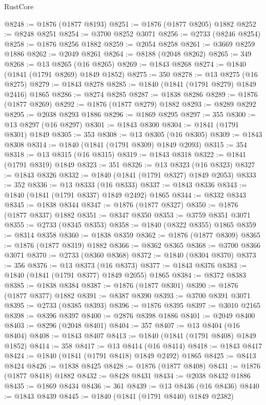 \begin{lexlean}{RustCore}
\begin{coremodule}
@8248 := @1876 (@1877 @8193)
@8251 := @1876 (@1877 @8205) @1882
@8252 := @8248 @8251
@8254 := @3700 @8252 @3071
@8256 := @2733 (@8246 @8254)
@8258 := @1876 @8256 @1882
@8259 := @2054 @8258
@8261 := @3669 @8259 @1886
@8262 := @2049 @8261
@8264 := @8188 (@2048 @8262)
@8265 := 349
@8268 := @13 @8265 (@16 @8265)
@8269 := @1843 @8268
@8274 := @1840 (@1841 (@1791 @8269) @1849 @1852)
@8275 := 350
@8278 := @13 @8275 (@16 @8275)
@8279 := @1843 @8278
@8285 := @1840 (@1841 (@1791 @8279) @1849 @2416) @1865
@8286 := @8274 @8285
@8287 := @1838 @8286
@8289 := @1876 (@1877 @8269)
@8292 := @1876 (@1877 @8279) @1882
@8293 := @8289 @8292
@8295 := @2038 @8293 @1886
@8296 := @1869 @8295
@8297 := 355
@8300 := @13 @8297 (@16 @8297)
@8301 := @1843 @8300
@8304 := @1841 (@1791 @8301) @1849
@8305 := 353
@8308 := @13 @8305 (@16 @8305)
@8309 := @1843 @8308
@8314 := @1840 (@1841 (@1791 @8309) @1849 @2093)
@8315 := 354
@8318 := @13 @8315 (@16 @8315)
@8319 := @1843 @8318
@8322 := @1841 (@1791 @8319) @1849
@8323 := 351
@8326 := @13 @8323 (@16 @8323)
@8327 := @1843 @8326
@8332 := @1840 (@1841 (@1791 @8327) @1849 @2053)
@8333 := 352
@8336 := @13 @8333 (@16 @8333)
@8337 := @1843 @8336
@8343 := @1840 (@1841 (@1791 @8337) @1849 @2492) @1865
@8344 := @8332 @8343
@8345 := @1838 @8344
@8347 := @1876 (@1877 @8327)
@8350 := @1876 (@1877 @8337) @1882
@8351 := @8347 @8350
@8353 := @3759 @8351 @3071
@8355 := @2733 (@8345 @8353)
@8358 := @1840 (@8322 @8355) @1865
@8359 := @8314 @8358
@8360 := @1838 @8359
@8362 := @1876 (@1877 @8309)
@8365 := @1876 (@1877 @8319) @1882
@8366 := @8362 @8365
@8368 := @3700 @8366 @3071
@8370 := @2733 (@8360 @8368)
@8372 := @1840 (@8304 @8370)
@8373 := 356
@8376 := @13 @8373 (@16 @8373)
@8377 := @1843 @8376
@8383 := @1840 (@1841 (@1791 @8377) @1849 @2055) @1865
@8384 := @8372 @8383
@8385 := @1838 @8384
@8387 := @1876 (@1877 @8301)
@8390 := @1876 (@1877 @8377) @1882
@8391 := @8387 @8390
@8393 := @3700 @8391 @3071
@8395 := @2733 (@8385 @8393)
@8396 := @1876 @8395
@8397 := @3010 @2165
@8398 := @8396 @8397
@8400 := @2876 @8398 @1886
@8401 := @2049 @8400
@8403 := @8296 (@2048 @8401)
@8404 := 357
@8407 := @13 @8404 (@16 @8404)
@8408 := @1843 @8407
@8413 := @1840 (@1841 (@1791 @8408) @1849 @1852)
@8414 := 358
@8417 := @13 @8414 (@16 @8414)
@8418 := @1843 @8417
@8424 := @1840 (@1841 (@1791 @8418) @1849 @2492) @1865
@8425 := @8413 @8424
@8426 := @1838 @8425
@8428 := @1876 (@1877 @8408)
@8431 := @1876 (@1877 @8418) @1882
@8432 := @8428 @8431
@8434 := @2038 @8432 @1886
@8435 := @1869 @8434
@8436 := 361
@8439 := @13 @8436 (@16 @8436)
@8440 := @1843 @8439
@8445 := @1840 (@1841 (@1791 @8440) @1849 @2382)

\end{coremodule}
\end{lexlean}
